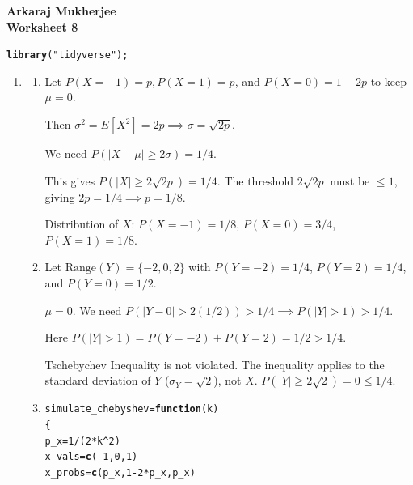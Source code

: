 \documentclass[12pt,a4paper]{article}\usepackage[]{graphicx}\usepackage[]{xcolor}
\makeatletter
\newcommand{\hlnum}[1]{\textcolor[rgb]{0.686,0.059,0.569}{#1}}%
\newcommand{\hlsng}[1]{\textcolor[rgb]{0.192,0.494,0.8}{#1}}%
\newcommand{\hlopt}[1]{\textcolor[rgb]{0,0,0}{#1}}%
\newcommand{\hldef}[1]{\textcolor[rgb]{0.345,0.345,0.345}{#1}}%
\newcommand{\hlkwa}[1]{\textcolor[rgb]{0.161,0.373,0.58}{\textbf{#1}}}%
\newcommand{\hlkwb}[1]{\textcolor[rgb]{0.69,0.353,0.396}{#1}}%
\newcommand{\hlkwc}[1]{\textcolor[rgb]{0.333,0.667,0.333}{#1}}%
\newcommand{\hlkwd}[1]{\textcolor[rgb]{0.737,0.353,0.396}{\textbf{#1}}}%
\newenvironment{kframe}{%
 \def\at@end@of@kframe{}%
 \ifinner\ifhmode%
  \def\at@end@of@kframe{\end{minipage}}%
  \begin{minipage}{\columnwidth}%
 \fi\fi%
 \def\FrameCommand##1{\hskip\@totalleftmargin \hskip-\fboxsep
 \colorbox{shadecolor}{##1}\hskip-\fboxsep
     \hskip-\linewidth \hskip-\@totalleftmargin \hskip\columnwidth}%
 \MakeFramed {\advance\hsize-\width
   \@totalleftmargin\z@ \linewidth\hsize
   \@setminipage}}%
 {\par\unskip\endMakeFramed%
 \at@end@of@kframe}
\newenvironment{knitrout}{}{} %
\makeatother
\begin{document}
{\bf Arkaraj Mukherjee}
\\
{\bf Worksheet 8}
\\
\begin{knitrout}
\color{fgcolor}\begin{kframe}
\begin{alltt}
\hlkwd{library}\hldef{(}\hlsng{"tidyverse"}\hldef{);}
\end{alltt}
\end{kframe}
\end{knitrout}
\begin{enumerate}[label=\arabic*.]
	\item
		\begin{enumerate}[label=(\alph*)]
			\item
			Let $P(X=-1) = p, P(X=1) = p$, and $P(X=0) = 1-2p$ to keep $\mu=0$.
			
			Then $\sigma^2 = E[X^2] = 2p \implies \sigma = \sqrt{2p}$.
			
			We need $P(|X - \mu| \ge 2\sigma) = 1/4$.
			
			This gives $P(|X| \ge 2\sqrt{2p}) = 1/4$. The threshold $2\sqrt{2p}$ must be $\le 1$, giving $2p = 1/4 \implies p = 1/8$.
			
			Distribution of $X$: $P(X=-1) = 1/8$, $P(X=0) = 3/4$, $P(X=1) = 1/8$.
			
			\item
			Let $\text{Range}(Y) = \{-2, 0, 2\}$ with $P(Y=-2) = 1/4$, $P(Y=2) = 1/4$, and $P(Y=0) = 1/2$.
			
			$\mu = 0$. We need $P(|Y - 0| > 2(1/2)) > 1/4 \implies P(|Y| > 1) > 1/4$.
			
			Here $P(|Y| > 1) = P(Y=-2) + P(Y=2) = 1/2 > 1/4$.
			
			Tschebychev Inequality is not violated. The inequality applies to the standard deviation of $Y$ ($\sigma_Y = \sqrt{2}$), not $X$. $P(|Y| \ge 2\sqrt{2}) = 0 \le 1/4$.
			
			\item
\begin{knitrout}
\color{fgcolor}\begin{kframe}
\begin{alltt}
\hldef{simulate_chebyshev} \hlkwb{=} \hlkwa{function}\hldef{(}\hlkwc{k}\hldef{)}
\hldef{\{}
  \hldef{p_x} \hlkwb{=} \hlnum{1}\hlopt{/}\hldef{(}\hlnum{2}\hlopt{*}\hldef{k}\hlopt{^}\hlnum{2}\hldef{)}
  \hldef{x_vals} \hlkwb{=} \hlkwd{c}\hldef{(}\hlopt{-}\hlnum{1}\hldef{,} \hlnum{0}\hldef{,} \hlnum{1}\hldef{)}
  \hldef{x_probs} \hlkwb{=} \hlkwd{c}\hldef{(p_x,} \hlnum{1} \hlopt{-} \hlnum{2}\hlopt{*}\hldef{p_x, p_x)}


\end{alltt}
\end{kframe}
\end{knitrout}
\end{enumerate}
\end{enumerate}
\end{document}
